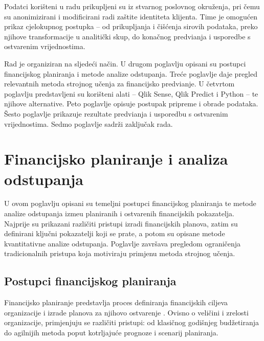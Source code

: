 \documentclass[zavrsnirad]{fer}
\begin{document}
Podatci kori\v{s}teni u radu prikupljeni su iz stvarnog poslovnog okru\v{z}enja, pri \v{c}emu su anonimizirani i modificirani radi za\v{s}tite identiteta klijenta. Time je omogu\'{c}en prikaz cjelokupnog postupka -- od prikupljanja i \v{c}i\v{s}\'{c}enja sirovih podataka, preko njihove transformacije u analiti\v{c}ki skup, do kona\v{c}nog predvi\dj anja i usporedbe s ostvarenim vrijednostima.

Rad je organiziran na sljede\'{c}i na\v{c}in. U drugom poglavlju opisani su postupci financijskog planiranja i metode analize odstupanja. Tre\'{c}e poglavlje daje pregled relevantnih metoda strojnog u\v{c}enja za financijsko predvi\dj anje. U \v{c}etvrtom poglavlju predstavljeni su kori\v{s}teni alati -- Qlik Sense, Qlik Predict i Python -- te njihove alternative. Peto poglavlje opisuje postupak pripreme i obrade podataka. \v{S}esto poglavlje prikazuje rezultate predvi\dj anja i usporedbu s ostvarenim vrijednostima. Sedmo poglavlje sadr\v{z}i zaklju\v{c}ak rada.


\chapter{Financijsko planiranje i analiza odstupanja}
\label{pog:financijsko_planiranje}

U ovom poglavlju opisani su temeljni postupci financijskog planiranja te metode analize odstupanja izme\dj u planiranih i ostvarenih financijskih pokazatelja. Najprije su prikazani razli\v{c}iti pristupi izradi financijskih planova, zatim su definirani klju\v{c}ni pokazatelji koji se prate, a potom su opisane metode kvantitativne analize odstupanja. Poglavlje zavr\v{s}ava pregledom ograni\v{c}enja tradicionalnih pristupa koja motiviraju primjenu metoda strojnog u\v{c}enja.

\section{Postupci financijskog planiranja}
\label{sec:postupci_planiranja}

Financijsko planiranje predstavlja proces definiranja financijskih ciljeva organizacije i izrade planova za njihovo ostvarenje \citep{brealey2020principles}. Ovisno o veli\v{c}ini i zrelosti organizacije, primjenjuju se razli\v{c}iti pristupi: od klasi\v{c}nog godi\v{s}njeg bud\v{z}etiranja do agilnijih metoda poput kotrljaju\'{c}e prognoze i scenarij planiranja.
\end{document}
